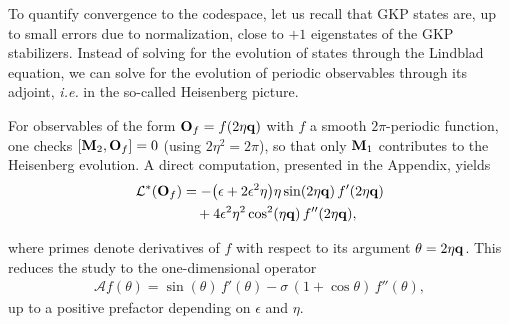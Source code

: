 \documentclass[a4paper, 11pt]{article}
\newcommand{\oM}{{\bf M}}
\newcommand{\oO}{{\bf O}}
\newcommand{\oq}{{\bf q}}
\begin{document}
To quantify convergence to the codespace, let us recall that GKP states are, up to small errors due to normalization, close to $+1$ eigenstates of the GKP stabilizers. Instead of solving for the evolution of states through the Lindblad equation, we can solve for the evolution of periodic observables through its adjoint, \emph{i.e.} in the so-called Heisenberg picture.




For observables of the form $\oO_f = f(2\eta \oq)$ with $f$ a smooth $2\pi$-periodic function, one checks $[\oM_2, \oO_f]=0$ (using $2\eta^2=2\pi$), so that only $\oM_1$ contributes to the Heisenberg evolution. A direct computation, presented in the Appendix, yields
\begin{align}
\label{eq:periodic_obs}
    \mathcal{L}^*(\oO_f) &= -\big(\epsilon + 2\epsilon^2\eta\big) \eta\sin(2\eta \oq)\, f'(2\eta \oq) \nonumber\\
    &\quad + 4\epsilon^2 \eta^2 \cos^2(\eta \oq)\, f''(2\eta \oq),
\end{align}

where primes denote derivatives of $f$ with respect to its argument $\theta = 2\eta \oq$. This reduces the study to the one-dimensional operator
\begin{align}\label{eq:reduced-op}
    \mathcal{A} f(\theta) = \sin(\theta)\, f'(\theta) - \sigma\,(1+\cos\theta)\, f''(\theta),
\end{align}
up to a positive prefactor depending on $\epsilon$ and $\eta$.
\end{document}
